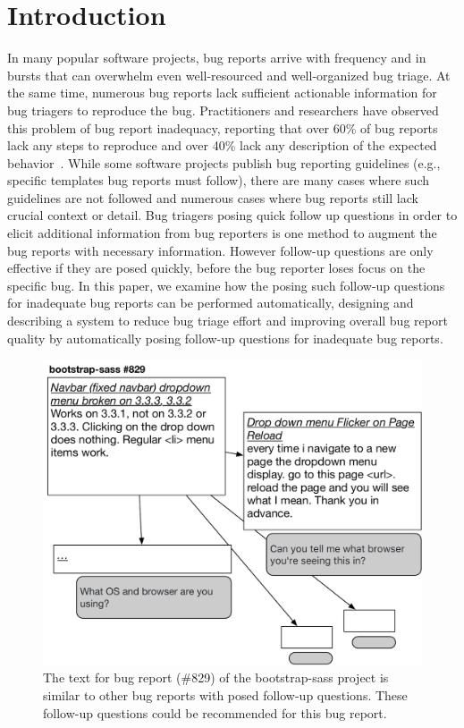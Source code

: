 \section{Introduction}

In many popular software projects, bug reports arrive with frequency and in bursts that can overwhelm even well-resourced and well-organized bug triage.
%
At the same time, numerous bug reports lack sufficient actionable information for bug triagers to reproduce the bug.
%
Practitioners and researchers have observed this problem of bug report inadequacy, reporting that over 60\% of bug reports lack any steps to reproduce and over 40\% lack any description of the expected behavior~\cite{chaparro17detecting}.
%
While some software projects publish bug reporting guidelines (e.g., specific templates bug reports must follow), there are many cases where such guidelines are not followed and numerous cases where bug reports still lack crucial context or detail.
%
Bug triagers posing quick follow up questions in order to elicit additional information from bug reporters is one method to augment the bug reports with necessary information.
%
However follow-up questions are only effective if they are posed quickly, before the bug reporter loses focus on the specific bug.
%
In this paper, we examine how the posing such follow-up questions for inadequate bug reports can be performed automatically, designing and describing a system to reduce bug triage effort and improving overall bug report quality by automatically posing follow-up questions for inadequate bug reports.

\begin{figure}[ht]
\centering
\includegraphics[width=0.99\linewidth]{figures/br_motivation.pdf}
\caption{The text for bug report (\#829) of the bootstrap-sass project is similar to other bug reports with posed follow-up questions. These follow-up questions could be recommended for this bug report.}
\label{fig:repo_activity}
\end{figure}



